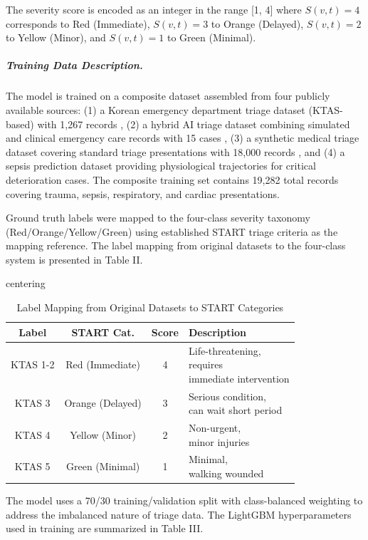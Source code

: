 \documentclass[conference]{IEEEtran}
\begin{document}
The severity score is encoded as an integer in the range [1, 4] where $S(v,t) = 4$ corresponds to Red (Immediate), $S(v,t) = 3$ to Orange (Delayed), $S(v,t) = 2$ to Yellow (Minor), and $S(v,t) = 1$ to Green (Minimal).

\subparagraph{Training Data Description.}
The model is trained on a composite dataset assembled from four publicly available sources: (1) a Korean emergency department triage dataset (KTAS-based) with 1,267 records \cite{ktas2023}, (2) a hybrid AI triage dataset combining simulated and clinical emergency care records with 15 cases \cite{hybridai2024}, (3) a synthetic medical triage dataset covering standard triage presentations with 18,000 records \cite{synthetic2024}, and (4) a sepsis prediction dataset providing physiological trajectories for critical deterioration cases. The composite training set contains 19,282 total records covering trauma, sepsis, respiratory, and cardiac presentations.

Ground truth labels were mapped to the four-class severity taxonomy (Red/Orange/Yellow/Green) using established START triage criteria as the mapping reference. The label mapping from original datasets to the four-class system is presented in Table II.

\begin{table}[t]
\caption{Label Mapping from Original Datasets to START Categories}
\label{tab:label_mapping}
centering
\begin{tabularx}{\linewidth}{|c|c|c|X|}
\hline
\textbf{Label} & \textbf{START Cat.} & \textbf{Score} & \textbf{Description} \\
\hline
KTAS 1-2 & Red (Immediate) & 4 & \makecell{Life-threatening,\\ requires\\ immediate intervention} \\
KTAS 3 & Orange (Delayed) & 3 & \makecell{Serious condition,\\ can wait short period} \\
KTAS 4 & Yellow (Minor) & 2 & \makecell{Non-urgent,\\ minor injuries} \\
KTAS 5 & Green (Minimal) & 1 & \makecell{Minimal,\\ walking wounded} \\
\hline
\end{tabularx}
\end{table}

The model uses a 70/30 training/validation split with class-balanced weighting to address the imbalanced nature of triage data. The LightGBM hyperparameters used in training are summarized in Table III.
\end{document}
